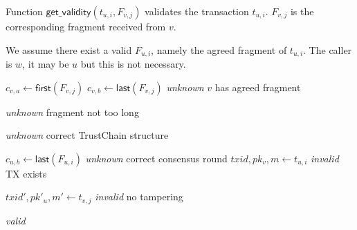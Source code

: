 \begin{algorithm}
\caption{Function $\textsf{get\_validity}(t_{u, i}, F_{v, j})$ validates the transaction $t_{u, i}$.
$F_{v, j}$ is the corresponding fragment received from $v$.}
We assume there exist a valid $F_{u, i}$, namely the agreed fragment of $t_{u, i}$. 
The caller is $w$, it may be $u$ but this is not necessary.
\label{alg:get-validity}

\begin{algorithmic}[1]


    \State $c_{v, a} \gets \textsf{first}(F_{v, j})$
    \State $c_{v, b} \gets \textsf{last}(F_{v, j})$
        \State \Return \emph{unknown}
    \EndIf \Comment $v$ has agreed fragment
    \State

        \State \Return \emph{unknown}
    \EndIf \Comment fragment not too long
    \State

            \State \Return \emph{unknown}
        \EndIf
    \EndIf \Comment correct TrustChain structure
    \State

    \State $c_{u, b} \gets \textsf{last}(F_{u, i})$
        \State \Return \emph{unknown}
    \EndIf \Comment correct consensus round
    \State
    \label{line:valid-fragment}
    \State $txid, pk_v, m \gets t_{u, i}$
        \State \Return \emph{invalid}
    \EndIf \Comment TX exists
    \State 

    \State $txid', pk'_u, m' \gets t_{v, j}$
        \State \Return \emph{invalid}
    \EndIf \Comment no tampering
    \State

    \State \Return \emph{valid}
\end{algorithmic}
\end{algorithm}

